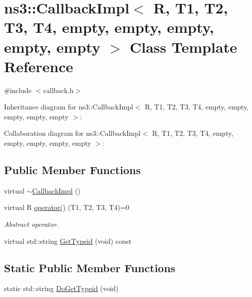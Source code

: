\hypertarget{classns3_1_1CallbackImpl_3_01R_00_01T1_00_01T2_00_01T3_00_01T4_00_01empty_00_01empty_00_01empty_00_01empty_00_01empty_01_4}{}\section{ns3\+:\+:Callback\+Impl$<$ R, T1, T2, T3, T4, empty, empty, empty, empty, empty $>$ Class Template Reference}
\label{classns3_1_1CallbackImpl_3_01R_00_01T1_00_01T2_00_01T3_00_01T4_00_01empty_00_01empty_00_01empty_00_01empty_00_01empty_01_4}


{\ttfamily \#include $<$callback.\+h$>$}



Inheritance diagram for ns3\+:\+:Callback\+Impl$<$ R, T1, T2, T3, T4, empty, empty, empty, empty, empty $>$\+:


Collaboration diagram for ns3\+:\+:Callback\+Impl$<$ R, T1, T2, T3, T4, empty, empty, empty, empty, empty $>$\+:
\subsection*{Public Member Functions}
\begin{DoxyCompactItemize}
\item 
virtual \hyperlink{classns3_1_1CallbackImpl_3_01R_00_01T1_00_01T2_00_01T3_00_01T4_00_01empty_00_01empty_00_01empty_00_01empty_00_01empty_01_4_a2e3aa5e7ba0ce0ef4bad8b0575461c37}{$\sim$\+Callback\+Impl} ()
\item 
virtual R \hyperlink{classns3_1_1CallbackImpl_3_01R_00_01T1_00_01T2_00_01T3_00_01T4_00_01empty_00_01empty_00_01empty_00_01empty_00_01empty_01_4_aac5eccf0b091533eb1c9e18a8509cc8e}{operator()} (T1, T2, T3, T4)=0
\begin{DoxyCompactList}\small\item\em Abstract operator. \end{DoxyCompactList}\item 
virtual std\+::string \hyperlink{classns3_1_1CallbackImpl_3_01R_00_01T1_00_01T2_00_01T3_00_01T4_00_01empty_00_01empty_00_01empty_00_01empty_00_01empty_01_4_a5c204ee5d698296e0fd070c59ca60965}{Get\+Typeid} (void) const 
\end{DoxyCompactItemize}
\subsection*{Static Public Member Functions}
\begin{DoxyCompactItemize}
\item 
static std\+::string \hyperlink{classns3_1_1CallbackImpl_3_01R_00_01T1_00_01T2_00_01T3_00_01T4_00_01empty_00_01empty_00_01empty_00_01empty_00_01empty_01_4_a4d3e5668c88731b144ba428cfc7f3e74}{Do\+Get\+Typeid} (void)
\end{DoxyCompactItemize}
